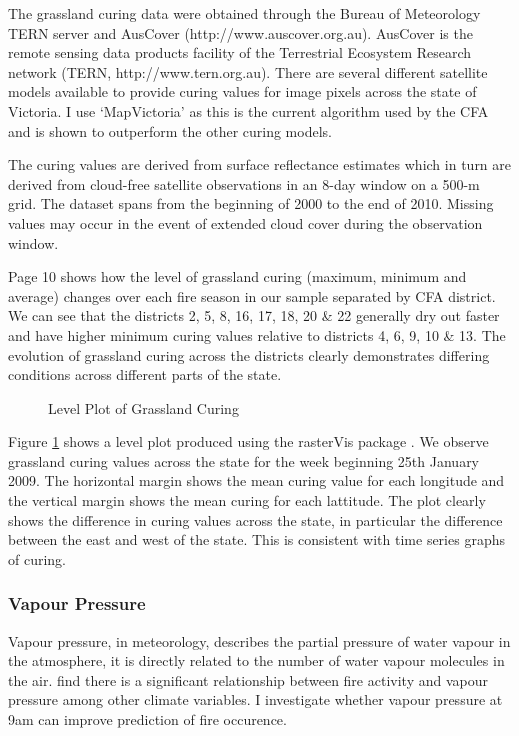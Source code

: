 \documentclass{article}
\begin{document}
The grassland curing data were obtained through the Bureau of Meteorology TERN server and AusCover (http://www.auscover.org.au). AusCover is the remote sensing data products facility of the Terrestrial Ecosystem Research network (TERN, http://www.tern.org.au). There are several different satellite models available to provide curing values for image pixels across the state of Victoria. I use `MapVictoria' \citep{martin15} as this is the current algorithm used by the CFA and is shown to outperform the other curing models. 

The curing values are derived from surface reflectance estimates which in turn are derived from cloud-free satellite observations in an 8-day window on a 500-m grid. The dataset spans from the beginning of 2000 to the end of 2010. Missing values may occur in the event of extended cloud cover during the observation window.

Page 10 shows how the level of grassland curing (maximum, minimum and average) changes over each fire season in our sample separated by CFA district. We can see that the districts 2, 5, 8, 16, 17, 18, 20 \&  22 generally dry out faster and have higher minimum curing values relative to districts 4, 6, 9, 10 \& 13. The evolution of grassland curing across the districts clearly demonstrates differing conditions across different parts of the state. 

%


\begin{figure}[h]
	\centering 
	\caption{Level Plot of Grassland Curing } 
	\label{fig:cur_lp} 
\end{figure}


Figure \ref{fig:cur_lp} shows a level plot produced using the rasterVis package \citep{rastervis}. We observe grassland curing values across the state for the week beginning 25th January 2009. The horizontal margin shows the mean curing value for each longitude and the vertical margin shows the mean curing for each lattitude. The plot clearly shows the difference in curing values across the state, in particular the difference between the east and west of the state. This is consistent with time series graphs of curing. 

\subsubsection{Vapour Pressure}
Vapour pressure, in meteorology, describes the partial pressure of water vapour in the atmosphere, it is directly related to the number of water vapour molecules in the air.  \citet{harris14} find there is a significant relationship between fire activity and vapour pressure among other climate variables. I investigate whether vapour pressure at 9am can improve prediction of fire occurence. 
\end{document}
